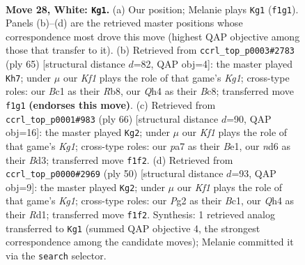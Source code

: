 \documentclass[11pt]{article}
\begin{document}
\clearpage

\begin{figure}[p]\centering
\begin{subfigure}{0.46\textwidth}\centering
\resizebox{\linewidth}{!}{%
\newchessgame
\chessboard[
  setfen={r1b5/ppp2ppk/3n3p/3P4/B6Q/2bq1P1P/PP4P1/R1B2K2 w - - 2 28},
  showmover=false,
  pgfstyle=straightmove, color=movearrow, markmove={f1-g1}
]}
\caption{}
\end{subfigure}\hfill
\begin{subfigure}{0.46\textwidth}\centering
\resizebox{\linewidth}{!}{%
\newchessgame
\chessboard[
  setfen={1rb3k1/6p1/1p1b3p/3P1p2/p1P2N2/q5P1/P1Q3BP/1R5K b - - 3 33},
  showmover=false,
  pgfstyle=straightmove, color=movearrow, markmove={g8-h7}
]}
\caption{}
\end{subfigure}
\\[4pt]
\begin{subfigure}{0.46\textwidth}\centering
\resizebox{\linewidth}{!}{%
\newchessgame
\chessboard[
  setfen={5k2/1p3pp1/1q3n1p/2brp3/p7/P2B1QPP/1PP2P2/1R2B1K1 w - - 2 34},
  showmover=false,
  pgfstyle=straightmove, color=movearrow, markmove={g1-g2}
]}
\caption{}
\end{subfigure}\hfill
\begin{subfigure}{0.46\textwidth}\centering
\resizebox{\linewidth}{!}{%
\newchessgame
\chessboard[
  setfen={4r1k1/pp3pp1/1bp2n2/4q2p/8/P1P2QPP/1P3P2/2BR1BK1 w - - 3 26},
  showmover=false,
  pgfstyle=straightmove, color=movearrow, markmove={g1-g2}
]}
\caption{}
\end{subfigure}
\caption{\textbf{Move 28, White: \texttt{Kg1}.} (a) Our position; Melanie plays \texttt{Kg1} (\texttt{f1g1}). Panels (b)--(d) are the retrieved master positions whose correspondence most drove this move (highest QAP objective among those that transfer to it). (b) Retrieved from \texttt{ccrl\_top\_p0003\#2783} (ply 65) [structural distance $d$=82, QAP obj=4]: the master played \texttt{Kh7}; under $\mu$ our \emph{Kf1} plays the role of that game's \emph{Kg1}; cross-type roles: our \emph{B}c1 as their \emph{R}b8, our \emph{Q}h4 as their \emph{B}c8; transferred move \texttt{f1g1} \textbf{(endorses this move)}. (c) Retrieved from \texttt{ccrl\_top\_p0001\#983} (ply 66) [structural distance $d$=90, QAP obj=16]: the master played \texttt{Kg2}; under $\mu$ our \emph{Kf1} plays the role of that game's \emph{Kg1}; cross-type roles: our \emph{p}a7 as their \emph{B}e1, our \emph{n}d6 as their \emph{B}d3; transferred move \texttt{f1f2}. (d) Retrieved from \texttt{ccrl\_top\_p0000\#2969} (ply 50) [structural distance $d$=93, QAP obj=9]: the master played \texttt{Kg2}; under $\mu$ our \emph{Kf1} plays the role of that game's \emph{Kg1}; cross-type roles: our \emph{P}g2 as their \emph{B}c1, our \emph{Q}h4 as their \emph{R}d1; transferred move \texttt{f1f2}. Synthesis: 1 retrieved analog transferred to \texttt{Kg1} (summed QAP objective 4, the strongest correspondence among the candidate moves); Melanie committed it via the \texttt{search} selector.}
\label{fig:thought-m54}
\end{figure}
\end{document}
